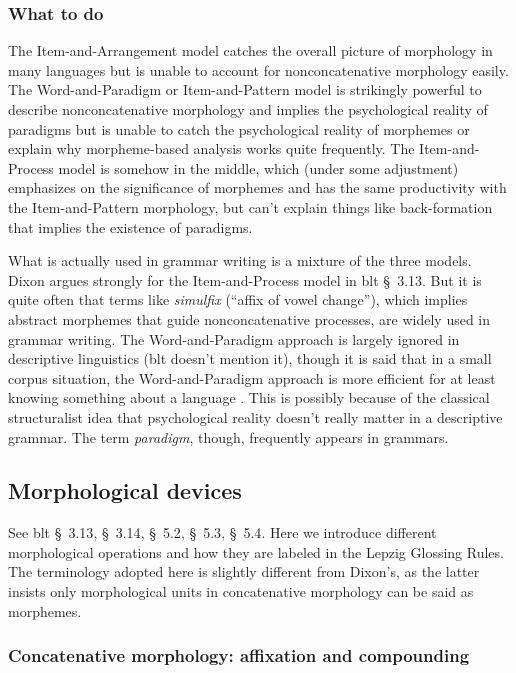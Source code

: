 \documentclass[UTF8, a4paper, oneside, scheme=plain]{ctexart}
\newcommand*{\citesec}[1]{\S~{#1}}
\newcommand*{\term}[1]{\emph{#1}}
\begin{document}
\subsubsection{What to do}\label{sec:practical-morphology}

The Item-and-Arrangement model catches the overall picture of morphology in many languages
but is unable to account for nonconcatenative morphology easily.
The Word-and-Paradigm or Item-and-Pattern model 
is strikingly powerful to describe nonconcatenative morphology
and implies the psychological reality of paradigms
but is unable to catch the psychological reality of morphemes
or explain why morpheme-based analysis works quite frequently.
The Item-and-Process model is somehow in the middle,
which (under some adjustment) emphasizes on the significance of morphemes
and has the same productivity with the Item-and-Pattern morphology,
but can't explain things like back-formation that implies the existence of paradigms.

What is actually used in grammar writing is a mixture of the three models.
Dixon argues strongly for the Item-and-Process model in \ac{blt} \citesec{3.13}.
But it is quite often that terms like \term{simulfix} (``affix of vowel change''),
which implies abstract morphemes that guide nonconcatenative processes,
are widely used in grammar writing.
The Word-and-Paradigm approach is largely ignored in descriptive linguistics
(\ac{blt} doesn't mention it),
though it is said that in a small corpus situation,
the Word-and-Paradigm approach is more efficient 
for at least knowing something about a language \citep{copot2022word}.
This is possibly because of the classical structuralist idea that
psychological reality doesn't really matter 
in a descriptive grammar.
The term \term{paradigm}, though, frequently appears in grammars.

\subsection{Morphological devices}

See \ac{blt} \citesec{3.13}, \citesec{3.14}, \citesec{5.2}, \citesec{5.3}, \citesec{5.4}.
Here we introduce different morphological operations and how they are labeled in the Lepzig Glossing Rules. 
The terminology adopted here is slightly different from Dixon's, 
as the latter insists only morphological units in concatenative morphology can be said as morphemes.

\subsubsection{Concatenative morphology: affixation and compounding}
\end{document}
